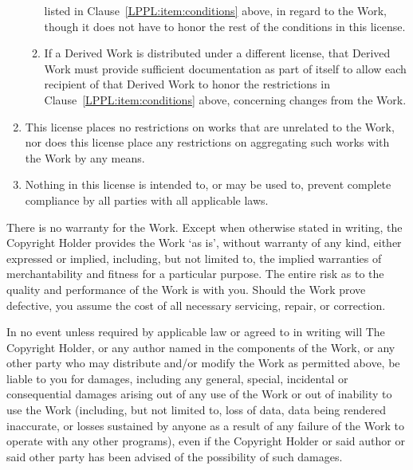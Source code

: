 \begin{LPPLicense}
\begin{enumerate}
\begin{enumerate}
                    listed in Clause~\ref{LPPL:item:conditions} above, in
                    regard to the Work, though it does not have to honor the
                    rest of the conditions in this license.
            \item If a Derived Work is distributed under a different license,
                that Derived Work must provide sufficient documentation as part
                of itself to allow each recipient of that Derived Work to honor
                the restrictions in Clause~\ref{LPPL:item:conditions} above,
                concerning changes from the Work.
            \end{enumerate}
        \item This license places no restrictions on works that are unrelated
            to the Work, nor does this license place any restrictions on
            aggregating such works with the Work by any means.
        \item Nothing in this license is intended to, or may be used to, prevent
            complete compliance by all parties with all applicable laws.
    \end{enumerate}


    \label{LPPL:Warranty}

    There is no warranty for the Work.  Except when otherwise stated in
    writing, the Copyright Holder provides the Work `as is', without warranty
    of any kind, either expressed or implied, including, but not limited to,
    the implied warranties of merchantability and fitness for a particular
    purpose.  The entire risk as to the quality and performance of the Work is
    with you.  Should the Work prove defective, you assume the cost of all
    necessary servicing, repair, or correction.

    In no event unless required by applicable law or agreed to in writing will
    The Copyright Holder, or any author named in the components of the Work, or
    any other party who may distribute and/or modify the Work as permitted
    above, be liable to you for damages, including any general, special,
    incidental or consequential damages arising out of any use of the Work or
    out of inability to use the Work (including, but not limited to, loss of
    data, data being rendered inaccurate, or losses sustained by anyone as a
    result of any failure of the Work to operate with any other programs), even
    if the Copyright Holder or said author or said other party has been advised
    of the possibility of such damages.



\end{LPPLicense}
